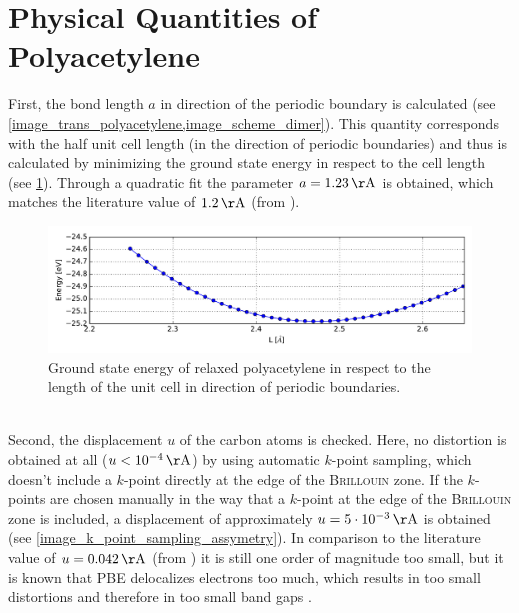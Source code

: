 \section{Physical Quantities of Polyacetylene}
First, the bond length $a$ in direction of the periodic boundary is calculated (see \cref{image_trans_polyacetylene,image_scheme_dimer}). This quantity corresponds with the half unit cell length (in the direction of periodic boundaries) and thus is calculated by minimizing the ground state energy in respect to the cell length (see \cref{image_poly_cell_len}). Through a quadratic fit the parameter $a = \unit[1.23]{\AA}$ is obtained, which matches the literature value of $\unit[1.2]{\AA}$ (from \cite{PhysRevLett.42.1698}).\\
\begin{figure}[!h]
	\centering
	\includegraphics[width = 13cm]{Images/polyacetylene/convergence/unit_cell_length}
	\caption{Ground state energy of relaxed polyacetylene in respect to the length of the unit cell in direction of periodic boundaries.}
	\label{image_poly_cell_len}
\end{figure}
\\
Second, the displacement $u$ of the carbon atoms is checked. Here, no distortion is obtained  at all ($u < \unit[10^{-4}]{\AA}$) by using automatic $k$-point sampling, which doesn't include a $k$-point directly at the edge of the \textsc{Brillouin} zone. If the $k$-points are chosen manually in the way that a $k$-point at the edge of the \textsc{Brillouin} zone is included, a displacement of approximately $u = \unit[5\cdot10^{-3}]{\AA}$ is obtained (see \cref{image_k_point_sampling_assymetry}). In comparison to the literature value of $u = \unit[0.042]{\AA}$ (from \cite{PhysRevLett.42.1698, doi:10.1021/cr990357p}) it is still one order of magnitude too small, but it is known that PBE delocalizes electrons too much, which results in too small distortions and therefore in too small band gaps  \cite{JIANG2009120,PhysRevB.84}.\\
